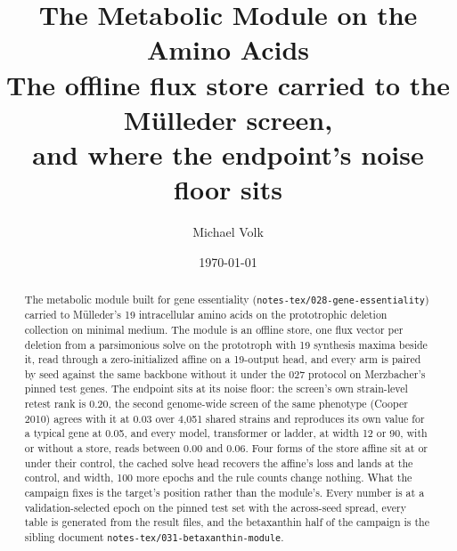 \documentclass[10pt,a4paper]{article}
\title{\vspace{-1.5em}The Metabolic Module on the Amino Acids\\
  {\large The offline flux store carried to the M\"ulleder screen,\\and where the endpoint's noise floor sits}}
\author{Michael Volk}
\date{\today}
\begin{document}
\maketitle
\thispagestyle{empty}

\begin{abstract}
\noindent
The metabolic module built for gene essentiality (\texttt{notes-tex/028-gene-essentiality})
carried to M\"ulleder's 19 intracellular amino acids on the prototrophic deletion
collection on minimal medium. The module is an offline store, one flux vector per
deletion from a parsimonious solve on the prototroph with 19 synthesis maxima beside it,
read through a zero-initialized affine on a 19-output head, and every arm is paired by
seed against the same backbone without it under the 027 protocol on Merzbacher's pinned
test genes. The endpoint sits at its noise floor: the screen's own strain-level retest
rank is 0.20, the second genome-wide screen of the same phenotype (Cooper 2010) agrees
with it at 0.03 over 4,051 shared strains and reproduces its own value for a typical
gene at 0.05, and every model, transformer or ladder, at width 12 or 90, with or without
a store, reads between 0.00 and 0.06. Four forms of the store affine sit at or under
their control, the cached solve head recovers the affine's loss and lands at the
control, and width, 100 more epochs and the rule counts change nothing. What the
campaign fixes is the target's position rather than the module's. Every number is at a
validation-selected epoch on the pinned test set with the across-seed spread, every
table is generated from the result files, and the betaxanthin half of the campaign is
the sibling document \texttt{notes-tex/031-betaxanthin-module}.
\end{abstract}

\vspace{0.5em}
\tccontents
\clearpage






\end{document}

